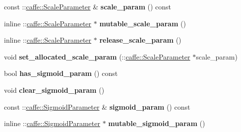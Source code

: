\begin{DoxyCompactItemize}
const \+::\mbox{\hyperlink{classcaffe_1_1_scale_parameter}{caffe\+::\+Scale\+Parameter}} \& {\bfseries scale\+\_\+param} () const
\item 
\mbox{\label{classcaffe_1_1_layer_parameter_ac6adea3bedbcd7218b2db6537832b57a}} 
inline \+::\mbox{\hyperlink{classcaffe_1_1_scale_parameter}{caffe\+::\+Scale\+Parameter}} $\ast$ {\bfseries mutable\+\_\+scale\+\_\+param} ()
\item 
\mbox{\label{classcaffe_1_1_layer_parameter_ab915fbe1d22aaf5c7b3c30d43e939fce}} 
inline \+::\mbox{\hyperlink{classcaffe_1_1_scale_parameter}{caffe\+::\+Scale\+Parameter}} $\ast$ {\bfseries release\+\_\+scale\+\_\+param} ()
\item 
\mbox{\label{classcaffe_1_1_layer_parameter_a943a6b72c8e7e94ac112471743b20f7f}} 
void {\bfseries set\+\_\+allocated\+\_\+scale\+\_\+param} (\+::\mbox{\hyperlink{classcaffe_1_1_scale_parameter}{caffe\+::\+Scale\+Parameter}} $\ast$scale\+\_\+param)
\item 
\mbox{\label{classcaffe_1_1_layer_parameter_ab15eb50f7589bc083b5bcdd4d42ea9ca}} 
bool {\bfseries has\+\_\+sigmoid\+\_\+param} () const
\item 
\mbox{\label{classcaffe_1_1_layer_parameter_af33c6881cd37c6b577822990b0d762f1}} 
void {\bfseries clear\+\_\+sigmoid\+\_\+param} ()
\item 
\mbox{\label{classcaffe_1_1_layer_parameter_ac73c3dd928d84d676bd1d584df870114}} 
const \+::\mbox{\hyperlink{classcaffe_1_1_sigmoid_parameter}{caffe\+::\+Sigmoid\+Parameter}} \& {\bfseries sigmoid\+\_\+param} () const
\item 
\mbox{\label{classcaffe_1_1_layer_parameter_ab42442d0032fd780da4dbf9374da4432}} 
inline \+::\mbox{\hyperlink{classcaffe_1_1_sigmoid_parameter}{caffe\+::\+Sigmoid\+Parameter}} $\ast$ {\bfseries mutable\+\_\+sigmoid\+\_\+param} ()
\item 
\mbox{\label{classcaffe_1_1_layer_parameter_a85a2a34ddc5807301d84b460aa3878bc}} 

\end{DoxyCompactItemize}

